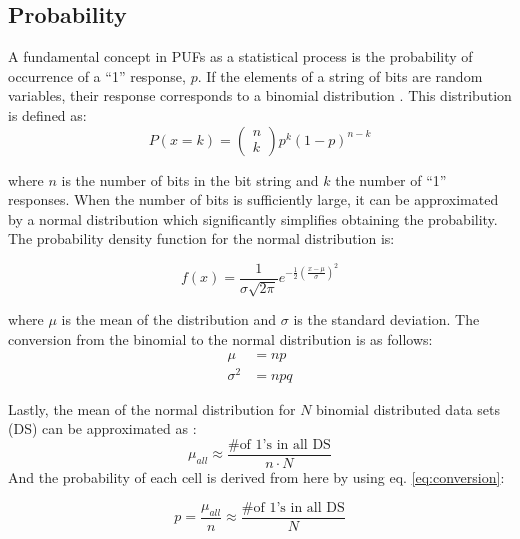 \subsection{Probability}
A fundamental concept in PUFs as a statistical process is the probability of occurrence of a “1” response, $p$. If the elements of a string of bits are random variables, their response corresponds to a binomial distribution \cite{Bohm2013}. This distribution is defined as: 
\begin{equation}
\label{eq:binomialpmf}
P(x=k)=
\left(\begin{array}{l}
n \\
k
\end{array}\right) p^{k}(1-p)^{n-k}\end{equation}

where $n$ is the number of bits in the bit string and $k$ the number of ``1'' responses. When the number of bits is sufficiently large, it can be approximated by a normal distribution which  significantly simplifies obtaining the probability. The probability density function for the normal distribution is: 

\begin{equation}f(x)=\frac{1}{\sigma \sqrt{2 \pi}} e^{-\frac{1}{2}\left(\frac{x-\mu}{\sigma}\right)^{2}}\end{equation}

where $\mu$ is the mean of the distribution and $\sigma$ is the standard deviation. The conversion from the binomial to the normal distribution is as follows:
\begin{equation}
\label{eq:conversion}
\begin{aligned}
\mu &=n p \\
\sigma^{2} &=n p q
\end{aligned}\end{equation}

Lastly, the mean of the normal distribution for $N$ binomial distributed data sets (DS) can be approximated as \cite{Bohm2013}:
\begin{equation}\mu_{a l l} \approx \frac{\# \text {of } 1 \text {'s in all  DS}}{n \cdot N}\end{equation}
And the probability of each cell is derived from here by using eq. \ref{eq:conversion}:

\begin{equation}
\label{eq:prob}
p=\frac{\mu_{a l l}}{n} \approx \frac{\# \text {of } 1 \text {'s in all  DS}}{N}
\end{equation} 

